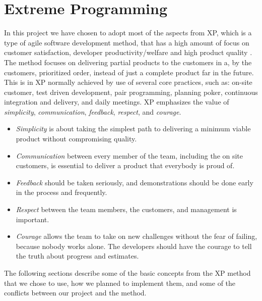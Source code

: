 
\section{Extreme Programming}
\label{sec:extreme_programming}

In this project we have chosen to adopt most of the aspects from XP, which is a type of agile software development method, that has a high amount of focus on customer satisfaction, developer productivity/welfare and high product quality \parencite{xp}. The method focuses on delivering partial products to the customers in a, by the customers, prioritized order, instead of just a complete product far in the future. This is in XP normally achieved by use of several core practices, such as: on-site customer, test driven development, pair programming, planning poker, continuous integration and delivery, and daily meetings. XP emphasizes the value of \emph{simplicity}, \emph{communication}, \emph{feedback}, \emph{respect}, and \emph{courage}. 

\begin{itemize}
    \setlength\itemsep{-0.2em}
	\item \emph{Simplicity} is about taking the simplest path to delivering a minimum viable product without compromising quality. 
	\item \emph{Communication} between every member of the team, including the on site customers, is essential to deliver a product that everybody is proud of. 
	\item \emph{Feedback} should be taken seriously, and demonstrations should be done early in the process and frequently.
	\item \emph{Respect} between the team members, the customers, and management is important.
	\item \emph{Courage} allows the team to take on new challenges without the fear of failing, because nobody works alone. The developers should have the courage to tell the truth about progress and estimates. 
\end{itemize}

The following sections describe some of the basic concepts from the XP method that we chose to use, how we planned to implement them, and some of the conflicts between our project and the method.

